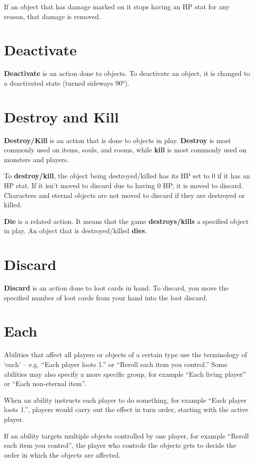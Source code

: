 \documentclass[a4paper, twoside]{report} %
\begin{document}
    If an object that has damage marked on it stops having an HP stat for any reason, that damage is removed.
    \section{Deactivate}
    \textbf{Deactivate} is an action done to objects. To deactivate an object, it is changed to a deactivated state (turned sideways 90°).
    \section{Destroy and Kill}
    \label{destroy}
    \textbf{Destroy/Kill} is an action that is done to objects in play. \textbf{Destroy} is most commonly used on items, souls, and rooms, while \textbf{kill} is most commonly used on monsters and players.

    To \textbf{destroy/kill}, the object being destroyed/killed has its HP set to 0 if it has an HP stat. If it isn’t moved to discard due to having 0 HP, it is moved to discard. Characters and eternal objects are not moved to discard if they are destroyed or killed.

    \textbf{Die} is a related action. It means that the game \textbf{destroys/kills} a specified object in play. An object that is destroyed/killed \textbf{dies}.
    \section{Discard}
    \textbf{Discard} is an action done to loot cards in hand. To discard, you move the specified number of loot cards from your hand into the loot discard.
    \section{Each}
    Abilities that affect all players or objects of a certain type use the terminology of ‘each’ – e.g. “Each player loots 1.” or “Reroll each item you control.” Some abilities may also specify a more specific group, for example “Each living player” or “Each non-eternal item”.

    When an ability instructs each player to do something, for example “Each player loots 1.”, players would carry out the effect in turn order, starting with the active player.

    If an ability targets multiple objects controlled by one player, for example “Reroll each item you control”, the player who controls the objects gets to decide the order in which the objects are affected.
\end{document}
